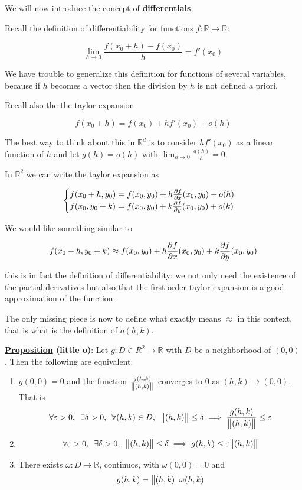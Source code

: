 \documentclass[10pt]{extarticle}
\newcommand{\R}{\mathbb{R}}
\begin{document}
We will now introduce the concept of \textbf{differentials}.

Recall the definition of differentiability for functions $f: \R \to \R$:

$$
    \lim_{h \to 0} \frac{f(x_0 + h) - f(x_0)}{h} = f'(x_0)
$$

We have trouble to generalize this definition for functions of several variables, because if $h$ becomes a vector then the division by $h$ is not defined a priori.

Recall also the the taylor expansion

$$
    f(x_0 + h) = f(x_0) + hf'(x_0) + o(h)
$$

The best way to think about this in $\R^d$ is to consider $hf'(x_0)$ as a linear function of $h$ and let $g(h) = o(h)$ with $\lim_{h \to 0} \frac{g(h)}{h} = 0$.

In $\R^2$ we can write the taylor expansion as

$$
    \begin{cases}
        f(x_0 + h, y_0) = f(x_0, y_0) + h \pdv{f}{x}()(x_0, y_0) + o(h) \\
        f(x_0, y_0 + k) = f(x_0, y_0) + k \pdv{f}{y}()(x_0, y_0) + o(k)
    \end{cases}
$$

We would like something similar to

$$
    f(x_0 + h, y_0 + k) \approx f(x_0, y_0) + h \pdv{f}{x}()(x_0, y_0) + k \pdv{f}{y}()(x_0, y_0)
$$

this is in fact the definition of differentiability: we not only need the existence of the partial derivatives but also that the first order taylor expansion is a good approximation of the function.

The only missing piece is now to define what exactly means $\approx$ in this context, that is what is the definition of $o(h, k)$.

\textbf{\underline{Proposition} (little o)}:
Let $g : D \in R^2 \to \R$ with $D$ be a neighborhood of $(0,0)$.
Then the following are equivalent:

\begin{enumerate}[label=(\roman*)]
    \item $g(0,0) = 0$ and the function $\frac{g(h,k)}{\norm{(h,k)}}$ converges to 0 as $(h,k) \to (0,0)$. That is
          $$
              \forall \varepsilon > 0, \enspace \exists \delta > 0, \enspace \forall (h,k) \in D, \enspace \norm{(h,k)} \leq \delta \implies \frac{g(h,k)}{\norm{(h,k)}} \leq \varepsilon
          $$
    \item
          $$
              \forall \varepsilon > 0, \enspace \exists \delta > 0, \enspace \norm{(h,k)} \leq \delta \implies g(h, k) \leq \varepsilon \norm{(h,k)}
          $$

    \item There exists $\omega: D \to \R$, continuos, with $\omega(0,0) = 0$ and
          $$
              g(h,k) = \norm{(h,k)} \omega(h,k)
          $$
\end{enumerate}
\end{document}
